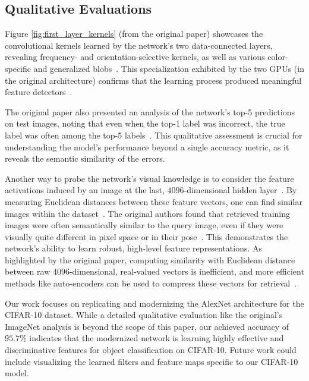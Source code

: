 \documentclass{article}
\begin{document}
\subsection{Qualitative Evaluations}
\noindent
Figure \ref{fig:first_layer_kernels} (from the original paper) showcases the convolutional kernels learned by the network's two data-connected layers, revealing frequency- and orientation-selective kernels, as well as various color-specific and generalized blobs~\cite{krizhevsky2012imagenet}. This specialization exhibited by the two GPUs (in the original architecture) confirms that the learning process produced meaningful feature detectors~\cite{krizhevsky2012imagenet}.

The original paper also presented an analysis of the network's top-5 predictions on test images, noting that even when the top-1 label was incorrect, the true label was often among the top-5 labels~\cite{krizhevsky2012imagenet}. This qualitative assessment is crucial for understanding the model's performance beyond a single accuracy metric, as it reveals the semantic similarity of the errors.

Another way to probe the network's visual knowledge is to consider the feature activations induced by an image at the last, $4096$-dimensional hidden layer~\cite{krizhevsky2012imagenet}. By measuring Euclidean distances between these feature vectors, one can find similar images within the dataset~\cite{krizhevsky2012imagenet}. The original authors found that retrieved training images were often semantically similar to the query image, even if they were visually quite different in pixel space or in their pose~\cite{krizhevsky2012imagenet}. This demonstrates the network's ability to learn robust, high-level feature representations. As highlighted by the original paper, computing similarity with Euclidean distance between raw $4096$-dimensional, real-valued vectors is inefficient, and more efficient methods like auto-encoders can be used to compress these vectors for retrieval~\cite{krizhevsky2011using}.

Our work focuses on replicating and modernizing the AlexNet architecture for the CIFAR-10 dataset. While a detailed qualitative evaluation like the original's ImageNet analysis is beyond the scope of this paper, our achieved accuracy of $95.7\%$ indicates that the modernized network is learning highly effective and discriminative features for object classification on CIFAR-10. Future work could include visualizing the learned filters and feature maps specific to our CIFAR-10 model.
\end{document}
